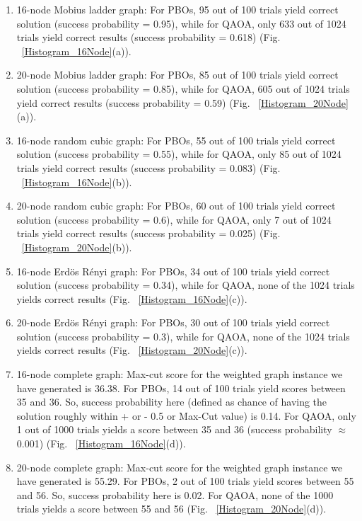 \documentclass[%
 reprint,
 amsmath,amssymb,
 aps,
]{revtex4-2}
\begin{document}
\begin{enumerate}
    \item 16-node Mobius ladder graph: For PBOs, 95 out of 100 trials yield correct solution (success probability = 0.95), while for QAOA, only 633 out of 1024 trials yield correct results (success probability = 0.618) (Fig. ~\ref{Histogram_16Node}(a)). 

    \item 20-node Mobius ladder graph: 
    For PBOs, 85 out of 100 trials yield correct solution (success probability = 0.85), while for QAOA, 605 out of 1024 trials yield correct results (success probability = 0.59) (Fig. ~\ref{Histogram_20Node}(a)). 

    \item 16-node random cubic graph:  For PBOs, 55 out of 100 trials yield correct solution (success probability = 0.55), while for QAOA, only 85 out of 1024 trials yield correct results (success probability = 0.083) (Fig. ~\ref{Histogram_16Node}(b)).

    \item 20-node random cubic graph:  For PBOs, 60 out of 100 trials yield correct solution (success probability = 0.6), while for QAOA, only 7 out of 1024 trials yield correct results (success probability = 0.025) (Fig. ~\ref{Histogram_20Node}(b)).

    \item 16-node Erd{\"o}s R{\'e}nyi graph: For PBOs, 34 out of 100 trials yield correct solution (success probability = 0.34), while for QAOA, none of the 1024 trials yields correct results (Fig. ~\ref{Histogram_16Node}(c)). 

    \item 20-node Erd{\"o}s R{\'e}nyi graph: For PBOs, 30 out of 100 trials yield correct solution (success probability = 0.3), while for QAOA, none of the 1024 trials yields correct results (Fig. ~\ref{Histogram_20Node}(c)). 

    \item 16-node complete graph: Max-cut score for the weighted graph instance we have generated is 36.38. For PBOs, 14 out of 100 trials yield scores between 35 and 36. So, success probability here (defined as chance of having the solution roughly within + or - 0.5 or Max-Cut value) is 0.14. For QAOA, only 1 out of 1000 trials yields a score between 35 and 36 (success probability $\approx$ 0.001) (Fig. ~\ref{Histogram_16Node}(d)).

    \item 20-node complete graph: Max-cut score for the weighted graph instance we have generated is 55.29. For PBOs, 2 out of 100 trials yield scores between 55 and 56. So, success probability here is 0.02. For QAOA, none of the 1000 trials yields a score between 55 and 56 (Fig. ~\ref{Histogram_20Node}(d)).

    

    

\end{enumerate}
\end{document}
